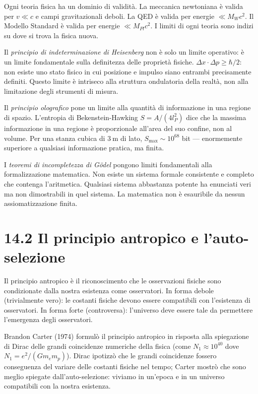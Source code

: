 \documentclass[11.5pt,a4paper,openany]{book}
\theoremstyle{remark}
\begin{document}
Ogni teoria fisica ha un dominio di validità. La meccanica newtoniana è valida per $v \ll c$ e campi gravitazionali deboli. La QED è valida per energie $\ll M_W c^2$. Il Modello Standard è valida per energie $\ll M_{Pl} c^2$. I limiti di ogni teoria sono indizi su dove si trova la fisica nuova.

Il \textit{principio di indeterminazione di Heisenberg} non è solo un limite operativo: è un limite fondamentale sulla definitezza delle proprietà fisiche. $\Delta x \cdot \Delta p \geq \hbar/2$: non esiste uno stato fisico in cui posizione e impulso siano entrambi precisamente definiti. Questo limite è intriseco alla struttura ondulatoria della realtà, non alla limitazione degli strumenti di misura.

Il \textit{principio olografico} pone un limite alla quantità di informazione in una regione di spazio. L'entropia di Bekenstein-Hawking $S = A/(4l_P^2)$ dice che la massima informazione in una regione è proporzionale all'area del suo confine, non al volume. Per una stanza cubica di $3\ \text{m}$ di lato, $S_{\max} \sim 10^{68}$ bit --- enormemente superiore a qualsiasi informazione pratica, ma finita.

I \textit{teoremi di incompletezza di Gödel} pongono limiti fondamentali alla formalizzazione matematica. Non esiste un sistema formale consistente e completo che contenga l'aritmetica. Qualsiasi sistema abbastanza potente ha enunciati veri ma non dimostrabili in quel sistema. La matematica non è esauribile da nessun assiomatizzazione finita.

\section{14.2 Il principio antropico e l'auto-selezione}

Il principio antropico è il riconoscimento che le osservazioni fisiche sono condizionate dalla nostra esistenza come osservatori. In forma debole (trivialmente vero): le costanti fisiche devono essere compatibili con l'esistenza di osservatori. In forma forte (controversa): l'universo deve essere tale da permettere l'emergenza degli osservatori.

Brandon Carter (1974) formulò il principio antropico in risposta alla spiegazione di Dirac delle grandi coincidenze numeriche della fisica (come $N_1 \approx 10^{40}$ dove $N_1 = e^2/(Gm_em_p)$). Dirac ipotizzò che le grandi coincidenze fossero conseguenza del variare delle costanti fisiche nel tempo; Carter mostrò che sono meglio spiegate dall'auto-selezione: viviamo in un'epoca e in un universo compatibili con la nostra esistenza.
\end{document}
